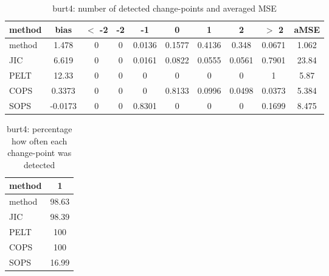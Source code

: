 \begin{table}[ht]
\centering
\begin{tabular}{l|c|ccccccc|c}
  \hline
method & bias & $<$ -2 & -2 & -1 & 0 & 1 & 2 & $>$ 2 & aMSE \\ 
  \hline
method & 1.478 &     0 &     0 & 0.0136 & 0.1577 & 0.4136 & 0.348 & 0.0671 & 1.062 \\ 
  JIC & 6.619 &     0 &     0 & 0.0161 & 0.0822 & 0.0555 & 0.0561 & 0.7901 & 23.84 \\ 
  PELT & 12.33 &     0 &     0 &     0 &     0 &     0 &     0 &     1 &  5.87 \\ 
  COPS & 0.3373 &     0 &     0 &     0 & 0.8133 & 0.0996 & 0.0498 & 0.0373 & 5.384 \\ 
  SOPS & -0.0173 &     0 &     0 & 0.8301 &     0 &     0 &     0 & 0.1699 & 8.475 \\ 
   \hline
\end{tabular}
\caption{burt4: number of detected change-points and averaged MSE} 
\label{tab:burt4Njumps}
\end{table}
\begin{table}[ht]
\centering
\begin{tabular}{l|c}
  \hline
method & 1 \\ 
  \hline
method &  98.63 \\ 
  JIC &  98.39 \\ 
  PELT &    100 \\ 
  COPS &    100 \\ 
  SOPS &  16.99 \\ 
   \hline
\end{tabular}
\caption{burt4: percentage how often each change-point was detected} 
\label{tab:burt4Detections}
\end{table}
